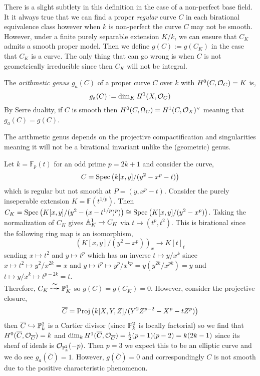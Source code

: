 \documentclass[12pt]{article}
\begin{document}
\begin{rmk}
There is a slight subtlety in this definition in the case of a non-perfect base field. It it always true that we can find a proper \textit{regular} curve $C$ in each birational equivalence class however when $k$ is non-perfect the curve $C$ may not be smooth. However, under a finite purely separable extension $K / k$, we can ensure that $C_K$ admits a smooth proper model. Then we define $g(C) := g(C_K)$ in the case that $C_K$ is a curve. The only thing that can go wrong is when $C$ is not geometrically irreducible since then $C_K$ will not be integral. 
\end{rmk}

\begin{defn}
The \textit{arithmetic genus} $g_a(C)$ of a proper curve $C$ over $k$ with $H^0(C, \struct{C}) = K$ is,
\[ g_a(C) := \dim_K H^1(X, \struct{C}) \]
By Serre duality, if $C$ is smooth then $H^0(C, \Omega_C) = H^1(C, \struct{X})^\vee$ meaning that $g_a(C) = g(C)$. 
\end{defn}

\begin{rmk}
The arithmetic genus depends on the projective compactification and singularities meaning it will not be a birational invariant unlike the (geometric) genus. 
\end{rmk}

\begin{example}
Let $k = \mathbb{F}_p(t)$ for an odd prime $p = 2k + 1$ and consider the curve,
\[ C = \Spec{k[x,y]/(y^2 - x^p - t)} \]
which is regular but not smooth at $P = (y, x^p - t)$. Consider the purely inseperable extension $K = \mathbb{F}(t^{1/p})$. Then $C_K = \Spec{K[x,y]/(y^2 - (x - t^{1/p})^p)} \cong \Spec{K[x,y]/(y^2 - x^p)}$. Taking the normalization of $C_K$ gives $\A^1_K \to C_K$ via $t \mapsto (t^p, t^2)$. This is birational since the following ring map is an isomorphism,
\[ (K[x,y]/(y^2 - x^p))_{x} \to K[t]_{t} \]
sending $x \mapsto t^2$ and $y \mapsto t^p$ which has an inverse $t \mapsto y/x^k$ since $x \mapsto t^2 \mapsto y^2/x^{2k} = x$ and $y \mapsto t^p \mapsto y^{p}/x^{kp} = y (y^{2k}/x^{pk}) = y$ and $t \mapsto y/x^k \mapsto t^{p - 2k} = t$. 
\bigskip\\
Therefore, $C_K \birat \P^1_K$ so $g(C) = g(C_K) = 0$. However, consider the projective closure,
\[ \overline{C} = \Proj{k[X,Y,Z]/(Y^2 Z^{p-2} - X^p - t Z^p)} \]
then $\overline{C} \embed \P^2_k$ is a Cartier divisor (since $\P^2_k$ is locally factorial) so we find that $H^0(\overline{C}, \struct{\overline{C}}) = k$ and $\dim_k H^1(\overline{C}, \struct{\overline{C}}) = \tfrac{1}{2}(p-1)(p-2) = k (2k - 1)$ since its sheaf of ideals is $\struct{\P^2_k}(-p)$. Then $p = 3$ we expect this to be an elliptic curve and we do see $g_a(\overline{C}) = 1$. However, $g(\overline{C}) = 0$ and correspondingly $C$ is not smooth due to the positive characteristic phenomenon. 
\end{example}
\end{document}
